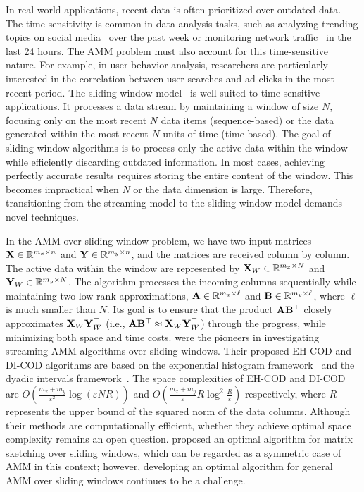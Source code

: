 In real-world applications, recent data is often prioritized over outdated data. The time sensitivity is common in data analysis tasks, such as analyzing trending topics on social media~\cite{becker2011beyond} over the past week or monitoring network traffic~\cite{joshi2015review} in the last 24 hours. The AMM problem must also account for this time-sensitive nature. For example, in user behavior analysis, researchers are particularly interested in the correlation between user searches and ad clicks in the most recent period.  
The sliding window model~\cite{datar2002maintaining} is well-suited to time-sensitive applications. It processes a data stream by maintaining a window of size $N$, focusing only on the most recent $N$ data items (sequence-based) or the data generated within the most recent $N$ units of time (time-based). The goal of sliding window algorithms is to process only the active data within the window while efficiently discarding outdated information. In most cases, achieving perfectly accurate results requires storing the entire content of the window. This becomes impractical when $N$ or the data dimension is large. Therefore, transitioning from the streaming model to the sliding window model demands novel techniques.

In the AMM over sliding window problem, we have two input matrices ${\bf X} \in \mathbb{R}^{m_x \times n}$ and ${\bf Y} \in \mathbb{R}^{m_y \times n}$, and the matrices are received column by column. The active data within the window are represented by ${\bf X}_W \in \mathbb{R}^{m_x \times N}$ and ${\bf Y}_W \in \mathbb{R}^{m_y \times N}$. The algorithm processes the incoming columns sequentially while maintaining two low-rank approximations, ${\bf A} \in \mathbb{R}^{m_x \times \ell}$ and ${\bf B} \in \mathbb{R}^{m_y \times \ell}$, where $\ell$ is much smaller than $N$. Its goal is to ensure that the product ${\bf A}{\bf B}^\top$ closely approximates ${\bf X}_W{\bf Y}_W^\top$ (i.e., ${\bf A}{\bf B}^\top \approx {\bf X}_W{\bf Y}_W^\top$) through the progress, while minimizing both space and time costs. \citet{yao2024approximate} were the pioneers in investigating streaming AMM algorithms over sliding windows. Their proposed EH-COD and DI-COD algorithms are based on the exponential histogram framework~\cite{datar2002maintaining} and the dyadic intervals framework~\cite{arasu2004approximate}. The space complexities of EH-COD and DI-COD are $O\left(\frac{m_x+m_y}{\varepsilon^2}\log{(\varepsilon NR)}\right)$  and $O\left(\frac{m_x+m_y}{\varepsilon}R\log^2{\frac{R}{\varepsilon}}\right)$ respectively, where $R$ represents the upper bound of the squared norm of the data columns. Although their methods are computationally efficient, whether they achieve optimal space complexity remains an open question. \citet{yin2024optimal} proposed an optimal algorithm for matrix sketching over sliding windows, which can be regarded as a symmetric case of AMM in this context; however, developing an optimal algorithm for general AMM over sliding windows continues to be a challenge.

